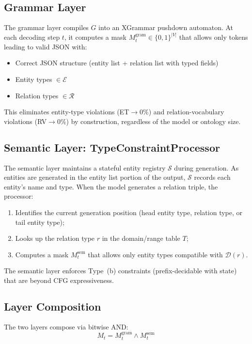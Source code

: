 \documentclass[11pt,a4paper]{article}
\begin{document}
\subsection{Grammar Layer}

The grammar layer compiles $G$ into an XGrammar pushdown automaton.
At each decoding step $t$, it computes a mask $M_t^{\text{gram}} \in \{0,1\}^{|V|}$ that allows only tokens leading to valid JSON with:
\begin{itemize}
    \item Correct JSON structure (entity list + relation list with typed fields)
    \item Entity types $\in \mathcal{E}$
    \item Relation types $\in \mathcal{R}$
\end{itemize}
This eliminates entity-type violations (ET$\to$0\%) and relation-vocabulary violations (RV$\to$0\%) by construction, regardless of the model or ontology size.

\subsection{Semantic Layer: TypeConstraintProcessor}

The semantic layer maintains a stateful entity registry $\mathcal{S}$ during generation.
As entities are generated in the entity list portion of the output, $\mathcal{S}$ records each entity's name and type.
When the model generates a relation triple, the processor:
\begin{enumerate}
    \item Identifies the current generation position (head entity type, relation type, or tail entity type);
    \item Looks up the relation type $r$ in the domain/range table $T$;
    \item Computes a mask $M_t^{\text{sem}}$ that allows only entity types compatible with $\mathcal{D}(r)$.
\end{enumerate}

The semantic layer enforces Type~(b) constraints (prefix-decidable with state) that are beyond CFG expressiveness.

\subsection{Layer Composition}

The two layers compose via bitwise AND:
\begin{equation}
    M_t = M_t^{\text{gram}} \wedge M_t^{\text{sem}}
    \label{eq:compose}
\end{equation}
\end{document}
